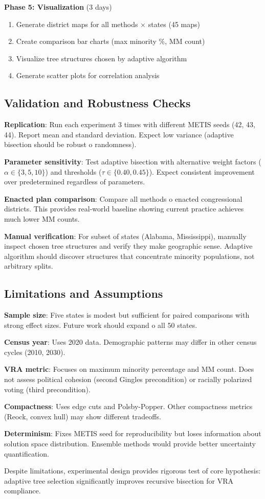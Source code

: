 \textbf{Phase 5: Visualization} (3 days)
\begin{enumerate}
\item Generate district maps for all methods × states (45 maps)
\item Create comparison bar charts (max minority \%, MM count)
\item Visualize tree structures chosen by adaptive algorithm
\item Generate scatter plots for correlation analysis
\end{enumerate}

\subsection{Validation and Robustness Checks}

\textbf{Replication}: Run each experiment 3 times with different METIS seeds (42, 43, 44). Report mean and standard deviation. Expect low variance (adaptive bisection should be robust 	o randomness).

\textbf{Parameter sensitivity}: Test adaptive bisection with alternative weight factors ($\alpha \in \{3, 5, 10\}$) and thresholds ($\tau \in \{0.40, 0.45\}$). Expect consistent improvement over predetermined regardless of parameters.

\textbf{Enacted plan comparison}: Compare all methods 	o enacted congressional districts. This provides real-world baseline showing current practice achieves much lower MM counts.

\textbf{Manual verification}: For subset of states (Alabama, Mississippi), manually inspect chosen tree structures and verify they make geographic sense. Adaptive algorithm should discover structures that concentrate minority populations, not arbitrary splits.

\subsection{Limitations and Assumptions}

\textbf{Sample size}: Five states is modest but sufficient for paired comparisons with strong effect sizes. Future work should expand 	o all 50 states.

\textbf{Census year}: Uses 2020 data. Demographic patterns may differ in other census cycles (2010, 2030).

\textbf{VRA metric}: Focuses on maximum minority percentage and MM count. Does not assess political cohesion (second Gingles precondition) or racially polarized voting (third precondition).

\textbf{Compactness}: Uses edge cuts and Polsby-Popper. Other compactness metrics (Reock, convex hull) may show different tradeoffs.

\textbf{Determinism}: Fixes METIS seed for reproducibility but loses information about solution space distribution. Ensemble methods would provide better uncertainty quantification.

Despite limitations, experimental design provides rigorous test of core hypothesis: adaptive tree selection significantly improves recursive bisection for VRA compliance.
